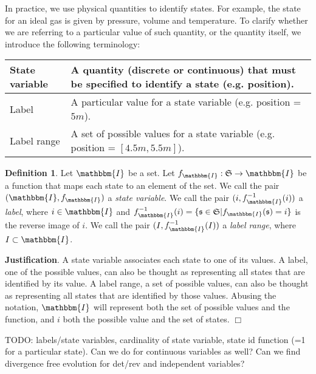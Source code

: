 \documentclass[aps,pra,10pt,twocolumn,floatfix,nofootinbib]{revtex4-1}
\theoremstyle{definition}
\newtheorem{defn}[thm]{Definition}
\newenvironment{justification}{\textbf{Justification}.}{$\Box$}
\begin{document}
In practice, we use physical quantities to identify states. For example, the state for an ideal gas is given by pressure, volume and temperature. To clarify whether we are referring to a particular value of such quantity, or the quantity itself, we introduce the following terminology:
\begin{center}
    \begin{tabular}{ | p{2.5cm} | p{5.5cm} | }
    \hline
    State variable & A quantity (discrete or continuous) that must be specified to identify a state (e.g. position). \\ \hline
    Label & A particular value for a state variable (e.g. position = $5m$). \\ \hline
    Label range & A set of possible values for a state variable (e.g. position = $[4.5m, 5.5m]$). \\
    \hline
    \end{tabular}
\end{center}

\begin{defn}\label{label}
Let $\mathbbm{I}$ be a set. Let $f_\mathbbm{I} : \mathfrak{S} \rightarrow \mathbbm{I}$ be a function that maps each state to an element of the set. We call the pair $(\mathbbm{I}, f_\mathbbm{I})$ a \emph{state variable}. We call the pair $(i, f_\mathbbm{I}^{-1}(i))$ a \emph{label}, where $i \in \mathbbm{I}$ and $f_\mathbbm{I}^{-1}(i) = \{\mathfrak{s} \in \mathfrak{S} | f_\mathbbm{I}(\mathfrak{s}) = i\}$ is the reverse image of $i$. We call the pair $(I, f_\mathbbm{I}^{-1}(I))$ a \emph{label range}, where $I \subset \mathbbm{I}$.
\end{defn}

\begin{justification}
A state variable associates each state to one of its values. A label, one of the possible values, can also be thought as representing all states that are identified by its value. A label range, a set of possible values, can also be thought as representing all states that are identified by those values. Abusing the notation, $\mathbbm{I}$ will represent both the set of possible values and the function, and $i$ both the possible value and the set of states.
\end{justification}

TODO: labels/state variables, cardinality of state variable, state id function (=1 for a particular state). Can we do for continuous variables as well? Can we find divergence free evolution for det/rev and independent variables?
\end{document}
